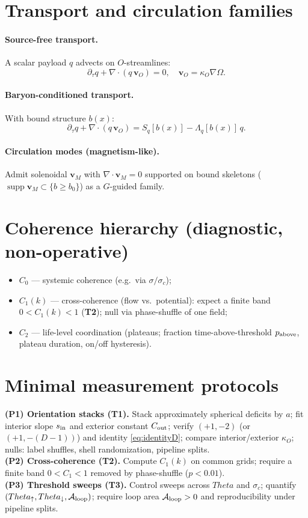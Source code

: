 \documentclass[12pt,a4paper,oneside]{scrreprt}
\def\Theta{Theta}%
\begin{document}
\section{Transport and circulation families}\label{sec:ur-families}
\paragraph{Source-free transport.}
A scalar payload $q$ advects on $O$-streamlines:
\[
\partial_{\tau}q+\nabla\!\cdot(q\,\mathbf v_O)=0,\quad \mathbf v_O=\kappa_O\nabla\Omega.
\]
\paragraph{Baryon-conditioned transport.}
With bound structure $b(x)$:
\[
\partial_{\tau}q+\nabla\!\cdot(q\,\mathbf v_O)=S_q[b(x)]-\Lambda_q[b(x)]\,q .
\]
\paragraph{Circulation modes (magnetism-like).}
Admit solenoidal $\mathbf v_M$ with $\nabla\!\cdot\mathbf v_M=0$ supported on bound skeletons ($\operatorname{supp}\mathbf v_M\subset\{b\ge b_0\}$) as a $G$-guided family.

\section{Coherence hierarchy (diagnostic, non-operative)}\label{sec:ur-coherence-hierarchy}
\begin{itemize}
\item $C_0$ — systemic coherence (e.g.\ via $\sigma/\sigma_c$); 
\item $C_1(k)$ — cross-coherence (flow vs.\ potential): expect a finite band $0<C_1(k)<1$ (\textbf{T2}); null via phase-shuffle of one field;
\item $C_2$ — life-level coordination (plateaus; fraction time-above-threshold $p_{\rm above}$, plateau duration, on/off hysteresis).
\end{itemize}

\section{Minimal measurement protocols}\label{sec:ur-protocols}
\textbf{(P1) Orientation stacks (T1).} Stack approximately spherical deficits by $a$; fit interior slope $s_{\rm in}$ and exterior constant $C_{\rm out}$; verify $(+1,-2)$ (or $(+1,-(D\!-\!1))$) and identity \eqref{eq:identityD}; compare interior/exterior $\kappa_O$; nulls: label shuffles, shell randomization, pipeline splits.\\
\textbf{(P2) Cross-coherence (T2).} Compute $C_1(k)$ on common grids; require a finite band $0<C_1<1$ removed by phase-shuffle ($p<0.01$).\\
\textbf{(P3) Threshold sweeps (T3).} Control sweeps across $\Theta$ and $\sigma_c$; quantify $(\Theta_\uparrow,\Theta_\downarrow,\mathcal A_{\rm loop})$; require loop area $\mathcal A_{\rm loop}>0$ and reproducibility under pipeline splits.
\end{document}
